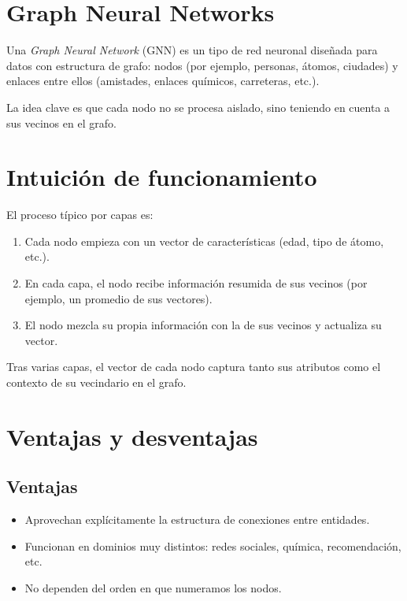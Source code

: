\documentclass[8pt,a4paper]{article}
\begin{document}
\section{Graph Neural Networks}

Una \emph{Graph Neural Network} (GNN) es un tipo de red neuronal diseñada para datos
con estructura de grafo: nodos (por ejemplo, personas, átomos, ciudades) y enlaces
entre ellos (amistades, enlaces químicos, carreteras, etc.).

La idea clave es que cada nodo no se procesa aislado, sino teniendo en cuenta a sus
vecinos en el grafo.

\section{Intuición de funcionamiento}

El proceso típico por capas es:

\begin{enumerate}
    \item Cada nodo empieza con un vector de características (edad, tipo de átomo, etc.).
    \item En cada capa, el nodo recibe información resumida de sus vecinos
    (por ejemplo, un promedio de sus vectores).
    \item El nodo mezcla su propia información con la de sus vecinos y actualiza su vector.
\end{enumerate}

Tras varias capas, el vector de cada nodo captura tanto sus atributos como el contexto
de su vecindario en el grafo.

\section{Ventajas y desventajas}

\subsection*{Ventajas}
\begin{itemize}
    \item Aprovechan explícitamente la estructura de conexiones entre entidades.
    \item Funcionan en dominios muy distintos: redes sociales, química, recomendación, etc.
    \item No dependen del orden en que numeramos los nodos.
\end{itemize}
\end{document}
